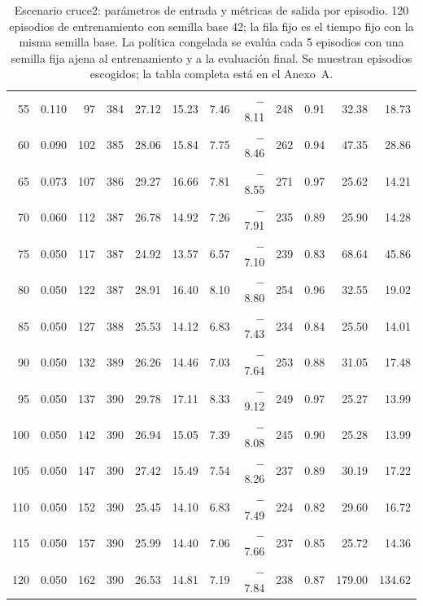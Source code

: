 \begin{table}[H]
\begin{tabular}{rrrrrrrrrrrr}
55 & 0.110 & 97 & 384 & 27.12 & 15.23 & 7.46 & $-$8.11 & 248 & 0.91 & 32.38 & 18.73 \\
60 & 0.090 & 102 & 385 & 28.06 & 15.84 & 7.75 & $-$8.46 & 262 & 0.94 & 47.35 & 28.86 \\
65 & 0.073 & 107 & 386 & 29.27 & 16.66 & 7.81 & $-$8.55 & 271 & 0.97 & 25.62 & 14.21 \\
70 & 0.060 & 112 & 387 & 26.78 & 14.92 & 7.26 & $-$7.91 & 235 & 0.89 & 25.90 & 14.28 \\
75 & 0.050 & 117 & 387 & 24.92 & 13.57 & 6.57 & $-$7.10 & 239 & 0.83 & 68.64 & 45.86 \\
80 & 0.050 & 122 & 387 & 28.91 & 16.40 & 8.10 & $-$8.80 & 254 & 0.96 & 32.55 & 19.02 \\
85 & 0.050 & 127 & 388 & 25.53 & 14.12 & 6.83 & $-$7.43 & 234 & 0.84 & 25.50 & 14.01 \\
90 & 0.050 & 132 & 389 & 26.26 & 14.46 & 7.03 & $-$7.64 & 253 & 0.88 & 31.05 & 17.48 \\
95 & 0.050 & 137 & 390 & 29.78 & 17.11 & 8.33 & $-$9.12 & 249 & 0.97 & 25.27 & 13.99 \\
100 & 0.050 & 142 & 390 & 26.94 & 15.05 & 7.39 & $-$8.08 & 245 & 0.90 & 25.28 & 13.99 \\
105 & 0.050 & 147 & 390 & 27.42 & 15.49 & 7.54 & $-$8.26 & 237 & 0.89 & 30.19 & 17.22 \\
110 & 0.050 & 152 & 390 & 25.45 & 14.10 & 6.83 & $-$7.49 & 224 & 0.82 & 29.60 & 16.72 \\
115 & 0.050 & 157 & 390 & 25.99 & 14.40 & 7.06 & $-$7.66 & 237 & 0.85 & 25.72 & 14.36 \\
120 & 0.050 & 162 & 390 & 26.53 & 14.81 & 7.19 & $-$7.84 & 238 & 0.87 & 179.00 & 134.62 \\
\bottomrule
\end{tabular}
\caption[Escenario cruce2: episodios de entrenamiento]{Escenario cruce2: parámetros de entrada y métricas de salida por episodio. 120 episodios de entrenamiento con semilla base 42; la fila fijo es el tiempo fijo con la misma semilla base. La política congelada se evalúa cada 5 episodios con una semilla fija ajena al entrenamiento y a la evaluación final. Se muestran episodios escogidos; la tabla completa está en el Anexo~A.}
\label{tab:cruce2-episodios-resumen}
\end{table}

